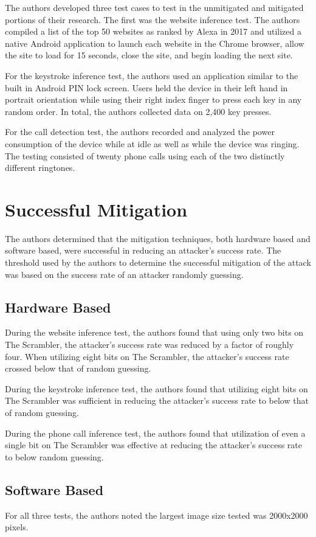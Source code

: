 The authors developed three test cases to test in the unmitigated and mitigated portions of their research. The first was the website inference test. The authors compiled a list of the top 50 websites as ranked by Alexa in 2017 and utilized a native Android application to launch each website in the Chrome browser, allow the site to load for 15 seconds, close the site, and begin loading the next site.

For the keystroke inference test, the authors used an application similar to the built in Android PIN lock screen. Users held the device in their left hand in portrait orientation while using their right index finger to press each key in any random order. In total, the authors collected data on 2,400 key presses. 

For the call detection test, the authors recorded and analyzed the power consumption of the device while at idle as well as while the device was ringing. The testing consisted of twenty phone calls using each of the two distinctly different ringtones. 

\section{Successful Mitigation}
The authors determined that the mitigation techniques, both hardware based and software based, were successful in reducing an attacker's success rate. The threshold used by the authors to determine the successful mitigation of the attack was based on the success rate of an attacker randomly guessing. 

\subsection{Hardware Based}
During the website inference test, the authors found that using only two bits on The Scrambler, the attacker's success rate was reduced by a factor of roughly four. When utilizing eight bits on The Scrambler, the attacker's success rate crossed below that of random guessing.

During the keystroke inference test, the authors found that utilizing eight bits on The Scrambler was sufficient in reducing the attacker's success rate to below that of random guessing.

During the phone call inference test, the authors found that utilization of even a single bit on The Scrambler was effective at reducing the attacker's success rate to below random guessing. 

\subsection{Software Based}
For all three tests, the authors noted the largest image size tested was 2000x2000 pixels.

